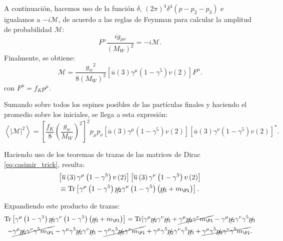 A continuación, hacemos uso de la función $\delta$, $\left( 2\pi \right) ^{4}\delta ^{4}\left(p-p_{2}-p_{3}\right)$ e igualamos a $-i\mathcal{M}$, de acuerdo a las reglas de Feynman para calcular la amplitud de probabilidad $\mathcal{M}$:
\begin{equation}
[\overline{u}\left( 3\right) \left( \dfrac{-ig_w}{2\sqrt{2}}\right) ^{2}\gamma ^{\mu }\left( 1-\gamma ^{5}\right) v\left( 2\right)]F^{\mu} \dfrac{ig{_{\mu \nu}}}{\left( M_W\right)^{2}}=-i\mathcal{M} .
\end{equation}
Finalmente, se obtiene:
\begin{equation}
\mathcal{M} =\dfrac{{g_{w}}^2}{8\left( M_W\right)^{2}}\left[ \overline{u}\left(3\right) \gamma^{\mu}\left( 1-\gamma ^{5} \right) v\left( 2\right) \right] F^{\mu} .
\end{equation}
con $F^{\mu}=f_K p^{\mu}$.

Sumando sobre todos los espines posibles de las partículas finales y haciendo el promedio sobre los iniciales, se llega a esta expresión:
\begin{equation}
\left\langle |\mathcal{M}|^{2}\right\rangle=\left[ \dfrac{f_{K}}{8}\left( \dfrac{g_w}{M_W}\right)^{2}\right]^{2} p_{\mu }p_{\nu} \left[ \overline{u}\left( 3\right)\gamma^{\mu}\left( 1-\gamma^{5}\right) v\left( 2\right) \right] \left[ \overline{u}\left( 3\right) \gamma^{\nu} \left( 1-\gamma^{5}\right) v\left( 2\right) \right] ^{\ast } .
\end{equation}

Haciendo uso de los teoremas de trazas de las matrices de Dirac \ref{eq:casimir_trick}, resulta:
\begin{multline}
\left[ \overline{u}\left( 3\right)\gamma^{\mu}\left( 1-\gamma^{5}\right) v\left( 2\right) \right] \left[ \overline{u}\left( 3\right) \gamma^{\nu }\left( 1-\gamma^{5}\right) v\left( 2\right) \right] \\ \equiv \Tr \left[ \gamma^{\mu } \left(1 -\gamma ^{5}\right) \slashed{p_{2}}\gamma^{\nu }\left( 1-\gamma ^{5}\right) \left( \slashed{p_{3}}+m_{\Pl}\right) \right] .
\end{multline}

Expandiendo este producto de trazas:
\begin{multline}
\Tr \left[ \gamma^{\mu } \left(1 -\gamma ^{5}\right) \slashed{p_{2}}\gamma^{\nu }\left( 1-\gamma ^{5}\right) \left( \slashed{p_{3}}+m_{\Pl}\right) \right] = \Tr[ \gamma ^{\mu }\slashed{p_{2}}\gamma ^{\nu }\slashed{p_{3}} + \cancel{\gamma ^{\mu }\slashed{p_{2}}\gamma ^{\nu }m_{\Pl}} -\gamma ^{\mu }\slashed{p_{2}}\gamma ^{\nu }\gamma ^{5}\slashed{p_{3}} \\ - \cancel{\gamma ^{\mu }\slashed{p_{2}}\gamma ^{\nu }\gamma ^{5}m_{\Pl}} -\gamma ^{\mu }\gamma ^{5}\slashed{p_{2}}\gamma ^{\nu }\slashed{p_{3}}- \cancel{\gamma ^{\mu }\gamma ^{5}\slashed{p_{2}}\gamma ^{\nu }m_{\Pl}} +\gamma ^{\mu }\gamma ^{5}\slashed{p_{2}}\gamma ^{\nu }\gamma ^{5}\slashed{p_{3}} + \cancel{\gamma ^{\mu }\gamma ^{5}\slashed{p_{2}}\gamma ^{\nu }\gamma ^{5}m_{\Pl}} .
\end{multline}

